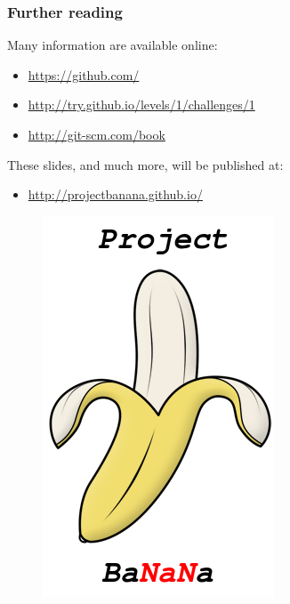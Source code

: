 \documentclass{beamer}
\begin{document}
\begin{frame}
\frametitle{Further reading}
Many information are available online:
\begin{itemize}
 \item \url{https://github.com/}
 \item \url{http://try.github.io/levels/1/challenges/1}
 \item \url{http://git-scm.com/book}
\end{itemize}
These slides, and much more, will be published at:
\begin{itemize}
 \item \url{http://projectbanana.github.io/}
\end{itemize}
 \begin{figure}
\centering
 \includegraphics[height=0.3\textheight]{../../images/logo}
\end{figure}
\end{frame}
\end{document}
